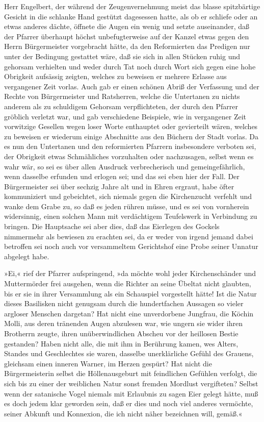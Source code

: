 Herr Engelbert, der während der Zeugenvernehmung meist das blasse
spitzbärtige Gesicht in die schlanke Hand gestützt dagesessen
hatte, als ob er schliefe oder an etwas anderes dächte, öffnete die
Augen ein wenig und setzte auseinander, daß der Pfarrer überhaupt
höchst unbefugterweise auf der Kanzel etwas gegen den Herrn
Bürgermeister vorgebracht hätte, da den Reformierten das Predigen
nur unter der Bedingung gestattet wäre, daß sie sich in allen
Stücken ruhig und gehorsam verhielten und weder durch Tat noch
durch Wort sich gegen eine hohe Obrigkeit aufsässig zeigten,
\pagenum{[33]} welches zu beweisen er mehrere Erlasse aus
vergangener Zeit vorlas. Auch gab er einen schönen Abriß der
Verfassung und der Rechte von Bürgermeister und Ratsherren, welche
die Untertanen zu nichts anderem als zu schuldigem Gehorsam
verpflichteten, der durch den Pfarrer gröblich verletzt war, und
gab verschiedene Beispiele, wie in vergangener Zeit vorwitzige
Gesellen wegen loser Worte enthauptet oder gevierteilt wären,
welches zu beweisen er wiederum einige Abschnitte aus den Büchern
der Stadt vorlas. Da es nun den Untertanen und den reformierten
Pfarrern insbesondere verboten sei, der Obrigkeit etwas
Schmähliches vorzuhalten oder nachzusagen, selbst wenn es wahr wär,
so sei es über allen Ausdruck verbrecherisch und gemeingefährlich,
wenn dasselbe erfunden und erlogen sei; und das sei eben hier der
Fall. Der Bürgermeister sei über sechzig Jahre alt und in Ehren
ergraut, habe öfter kommuniziert und gebeichtet, sich niemals gegen
die Kirchenzucht verfehlt und wanke dem Grabe zu, so daß es jeden
rühren müsse, und es sei von vornherein widersinnig, einen solchen
Mann mit verdächtigem Teufelswerk in Verbindung zu bringen. Die
Hauptsache sei aber dies, daß das Eierlegen des Gockels nimmermehr
als bewiesen zu erachten sei, da er weder von irgend jemand dabei
betroffen sei noch auch vor versammeltem Gerichtshof eine Probe
seiner Unnatur abgelegt habe.

»Ei,« rief der Pfarrer aufspringend, »da möchte wohl jeder
Kirchenschänder und Muttermörder frei ausgehen, wenn die Richter an
seine Übeltat nicht glaubten, bis er sie in ihrer Versammlung als
ein Schauspiel vorgestellt hätte! Ist die Natur dieses Basilisken
nicht genugsam durch die hundertfachen Aussagen so vieler argloser
Menschen dargetan? Hat nicht eine unverdorbene Jungfrau, die Köchin
\pagenum{[34]} Molli, aus deren tränenden Augen abzulesen war, wie
ungern sie wider ihren Brotherrn zeugte, ihren unüberwindlichen
Abscheu vor der heillosen Bestie gestanden? Haben nicht alle, die
mit ihm in Berührung kamen, wes Alters, Standes und Geschlechtes
sie waren, dasselbe unerklärliche Gefühl des Grauens, gleichsam
einen inneren Warner, im Herzen gespürt? Hat nicht die
Bürgermeisterin selbst die Höllenausgeburt mit feindlichen Gefühlen
verfolgt, die sich bis zu einer der weiblichen Natur sonst fremden
Mordlust vergifteten? Selbst wenn der satanische Vogel niemals mit
Erlaubnis zu sagen Eier gelegt hätte, muß es doch jedem klar
geworden sein, daß er dies und noch viel anderes vermöchte, seiner
Abkunft und Konnexion, die ich nicht näher bezeichnen will,
gemäß.«

